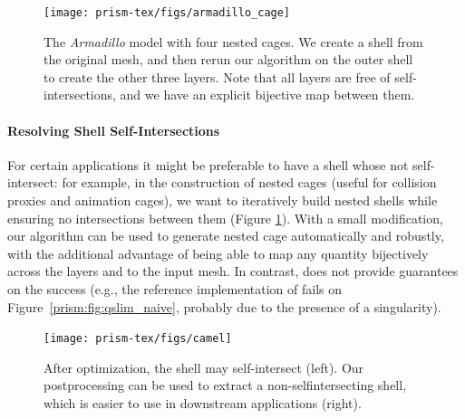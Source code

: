 \begin{figure}
    \centering
    \texttt{[image: prism-tex/figs/armadillo\_cage]}
    \caption{The \protect\emph{Armadillo} model with four nested cages. We create a shell from the original mesh, and then rerun our algorithm on the outer shell to create the other three layers. Note that all layers are free of self-intersections, and we have an explicit bijective map between them.}
    
    \label{prism:fig:nested-cages}
\end{figure}

\paragraph{Resolving Shell Self-Intersections}
\label{sec:postprocessing}
For certain applications it might be preferable to have a shell whose   not self-intersect:
for example, in the construction of nested cages \cite{sacht2015nested} (useful for collision proxies and animation cages), we want to iteratively build nested shells while ensuring no intersections between them (Figure \ref{prism:fig:nested-cages}). 
With a small modification, our algorithm can be used to generate nested cage automatically and robustly, with the additional advantage of being able to map any quantity  bijectively across the layers and to the input mesh. In contrast, \cite{sacht2015nested}
does not provide guarantees on the success (e.g., the reference implementation of \cite{sacht2015nested} fails on Figure~\ref{prism:fig:qslim_naive}, probably due to the presence of a singularity). 
\begin{figure}
    \centering
    \texttt{[image: prism-tex/figs/camel]}
    \caption{After optimization, the shell may self-intersect (left). Our postprocessing can be used to extract a non-selfintersecting shell, which is easier to use in downstream applications (right).}
    \label{prism:fig:shell_shrinking-cages}
    
\end{figure}


